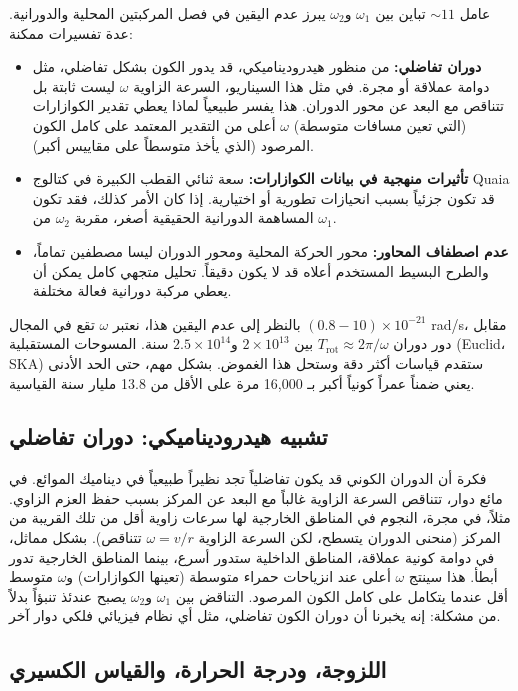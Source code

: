 \documentclass[12pt,a4paper]{article}
\begin{document}
	عامل \(\sim11\) تباين بين \(\omega_1\) و\(\omega_2\) يبرز عدم اليقين في فصل المركبتين المحلية والدورانية. عدة تفسيرات ممكنة:
	\begin{itemize}
		\item \textbf{دوران تفاضلي:} من منظور هيدروديناميكي، قد يدور الكون بشكل تفاضلي، مثل دوامة عملاقة أو مجرة. في مثل هذا السيناريو، السرعة الزاوية \(\omega\) ليست ثابتة بل تتناقص مع البعد عن محور الدوران. هذا يفسر طبيعياً لماذا يعطي تقدير الكوازارات (التي تعين مسافات متوسطة) \(\omega\) أعلى من التقدير المعتمد على كامل الكون المرصود (الذي يأخذ متوسطاً على مقاييس أكبر).
		\item \textbf{تأثيرات منهجية في بيانات الكوازارات:} سعة ثنائي القطب الكبيرة في كتالوج Quaia قد تكون جزئياً بسبب انحيازات تطورية أو اختيارية. إذا كان الأمر كذلك، فقد تكون المساهمة الدورانية الحقيقية أصغر، مقربة \(\omega_2\) من \(\omega_1\).
		\item \textbf{عدم اصطفاف المحاور:} محور الحركة المحلية ومحور الدوران ليسا مصطفين تماماً، والطرح البسيط المستخدم أعلاه قد لا يكون دقيقاً. تحليل متجهي كامل يمكن أن يعطي مركبة دورانية فعالة مختلفة.
	\end{itemize}
	بالنظر إلى عدم اليقين هذا، نعتبر \(\omega\) تقع في المجال \((0.8-10)\times10^{-21}\) rad/s، مقابل دور دوران \(T_{\text{rot}} \approx 2\pi/\omega\) بين \(2\times10^{13}\) و\(2.5\times10^{14}\) سنة. المسوحات المستقبلية (Euclid، SKA) ستقدم قياسات أكثر دقة وستحل هذا الغموض. بشكل مهم، حتى الحد الأدنى يعني ضمناً عمراً كونياً أكبر بـ 16,000 مرة على الأقل من 13.8 مليار سنة القياسية.
	
	\subsection{تشبيه هيدروديناميكي: دوران تفاضلي}
	
	فكرة أن الدوران الكوني قد يكون تفاضلياً تجد نظيراً طبيعياً في ديناميك الموائع. في مائع دوار، تتناقص السرعة الزاوية غالباً مع البعد عن المركز بسبب حفظ العزم الزاوي. مثلاً، في مجرة، النجوم في المناطق الخارجية لها سرعات زاوية أقل من تلك القريبة من المركز (منحنى الدوران يتسطح، لكن السرعة الزاوية \(\omega = v/r\) تتناقص). بشكل مماثل، في دوامة كونية عملاقة، المناطق الداخلية ستدور أسرع، بينما المناطق الخارجية تدور أبطأ. هذا سينتج \(\omega\) أعلى عند انزياحات حمراء متوسطة (تعينها الكوازارات) و\(\omega\) متوسط أقل عندما يتكامل على كامل الكون المرصود. التناقض بين \(\omega_1\) و\(\omega_2\) يصبح عندئذ تنبؤاً بدلاً من مشكلة: إنه يخبرنا أن دوران الكون تفاضلي، مثل أي نظام فيزيائي فلكي دوار آخر.
	
	\subsection{اللزوجة، ودرجة الحرارة، والقياس الكسيري}
	
\end{document}
